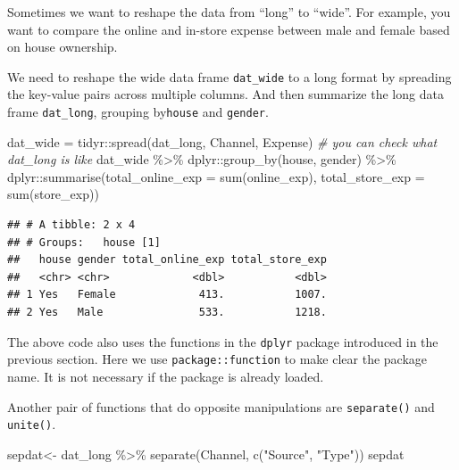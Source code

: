 \documentclass[
  12pt,
]{krantz}
\makeatletter
\newenvironment{Shaded}{\begin{snugshade}}{\end{snugshade}}
\newcommand{\AttributeTok}[1]{\textcolor[rgb]{0.61,0.61,0.61}{#1}}
\newcommand{\CommentTok}[1]{\textcolor[rgb]{0.37,0.37,0.37}{\textit{#1}}}
\newcommand{\FunctionTok}[1]{\textcolor[rgb]{0,0,0}{#1}}
\newcommand{\NormalTok}[1]{#1}
\newcommand{\OtherTok}[1]{\textcolor[rgb]{0.37,0.37,0.37}{#1}}
\newcommand{\SpecialCharTok}[1]{\textcolor[rgb]{0,0,0}{#1}}
\newcommand{\StringTok}[1]{\textcolor[rgb]{0.5,0.5,0.5}{#1}}
\newenvironment{kframe}{%
\medskip{}
\setlength{\fboxsep}{.8em}
 \def\at@end@of@kframe{}%
 \ifinner\ifhmode%
  \def\at@end@of@kframe{\end{minipage}}%
  \begin{minipage}{\columnwidth}%
 \fi\fi%
 \def\FrameCommand##1{\hskip\@totalleftmargin \hskip-\fboxsep
 \colorbox{shadecolor}{##1}\hskip-\fboxsep
     \hskip-\linewidth \hskip-\@totalleftmargin \hskip\columnwidth}%
 \MakeFramed {\advance\hsize-\width
   \@totalleftmargin\z@ \linewidth\hsize
   \@setminipage}}%
 {\par\unskip\endMakeFramed%
 \at@end@of@kframe}
\renewenvironment{Shaded}{\begin{kframe}}{\end{kframe}}
\makeatother
\begin{document}
Sometimes we want to reshape the data from ``long'' to ``wide''. For example, you want to compare the online and in-store expense between male and female based on house ownership.

We need to reshape the wide data frame \texttt{dat\_wide} to a long format by spreading the key-value pairs across multiple columns. And then summarize the long data frame \texttt{dat\_long}, grouping by\texttt{house} and \texttt{gender}.

\begin{Shaded}
\begin{Highlighting}[]
\NormalTok{dat\_wide }\OtherTok{=}\NormalTok{ tidyr}\SpecialCharTok{::}\FunctionTok{spread}\NormalTok{(dat\_long, Channel, Expense)}
\CommentTok{\# you can check what dat\_long is like}
\NormalTok{dat\_wide }\SpecialCharTok{\%\textgreater{}\%} 
\NormalTok{  dplyr}\SpecialCharTok{::}\FunctionTok{group\_by}\NormalTok{(house, gender) }\SpecialCharTok{\%\textgreater{}\%} 
\NormalTok{  dplyr}\SpecialCharTok{::}\FunctionTok{summarise}\NormalTok{(}\AttributeTok{total\_online\_exp =} \FunctionTok{sum}\NormalTok{(online\_exp),}
                   \AttributeTok{total\_store\_exp =} \FunctionTok{sum}\NormalTok{(store\_exp))}
\end{Highlighting}
\end{Shaded}

\begin{verbatim}
## # A tibble: 2 x 4
## # Groups:   house [1]
##   house gender total_online_exp total_store_exp
##   <chr> <chr>             <dbl>           <dbl>
## 1 Yes   Female             413.           1007.
## 2 Yes   Male               533.           1218.
\end{verbatim}

The above code also uses the functions in the \texttt{dplyr} package introduced in the previous section. Here we use \texttt{package::function} to make clear the package name. It is not necessary if the package is already loaded.

Another pair of functions that do opposite manipulations are \texttt{separate()} and \texttt{unite()}.

\begin{Shaded}
\begin{Highlighting}[]
\NormalTok{sepdat}\OtherTok{\textless{}{-}}\NormalTok{ dat\_long }\SpecialCharTok{\%\textgreater{}\%} 
  \FunctionTok{separate}\NormalTok{(Channel, }\FunctionTok{c}\NormalTok{(}\StringTok{"Source"}\NormalTok{, }\StringTok{"Type"}\NormalTok{))}
\NormalTok{sepdat}
\end{Highlighting}
\end{Shaded}
\end{document}
